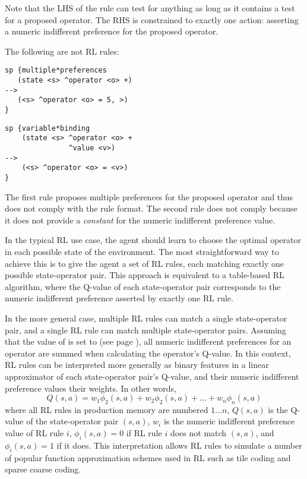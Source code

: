 Note that the LHS of the rule can test for anything as long as it contains a test for a proposed operator.
The RHS is constrained to exactly one action: asserting a numeric indifferent preference for the proposed operator.

The following are not RL rules:

\begin{verbatim}
sp {multiple*preferences
   (state <s> ^operator <o> +)
-->
   (<s> ^operator <o> = 5, >)
}
\end{verbatim}  \vspace{12pt}

\begin{verbatim}
sp {variable*binding
    (state <s> ^operator <o> +
               ^value <v>)
-->
    (<s> ^operator <o> = <v>)
}
\end{verbatim}

The first rule proposes multiple preferences for the proposed operator and thus does not comply with the rule format.
The second rule does not comply because it does not provide a \emph{constant} for the numeric indifferent preference value.

In the typical RL use case, the agent should learn to choose the optimal operator in each possible state of the environment.
The most straightforward way to achieve this is to give the agent a set of RL rules, each matching exactly one possible state-operator pair.
This approach is equivalent to a table-based RL algorithm, where the Q-value of each state-operator pair corresponds to the numeric indifferent preference asserted by exactly one RL rule.

In the more general case, multiple RL rules can match a single state-operator pair, and a single RL rule can match multiple state-operator pairs.
Assuming that the value of  is set to  (see page \pageref{numeric-indifferent-mode}), all numeric indifferent preferences for an operator are summed when calculating the operator's Q-value.
In this context, RL rules can be interpreted more generally as binary features in a linear approximator of each state-operator pair's Q-value, and their numeric indifferent preference values their weights.
In other words,
$$Q(s, a) = w_1 \phi_2 (s, a) + w_2 \phi_2 (s, a) + \ldots + w_n \phi_n (s, a)$$
where all RL rules in production memory are numbered $1 \dots n$, $Q(s, a)$ is the Q-value of the state-operator pair $(s, a)$, $w_i$ is the numeric indifferent preference value of RL rule $i$, $\phi_i (s, a) = 0$ if RL rule $i$ does not match $(s, a)$, and $\phi_i (s, a) = 1$ if it does.
This interpretation allows RL rules to simulate a number of popular function approximation schemes used in RL such as tile coding and sparse coarse coding.

